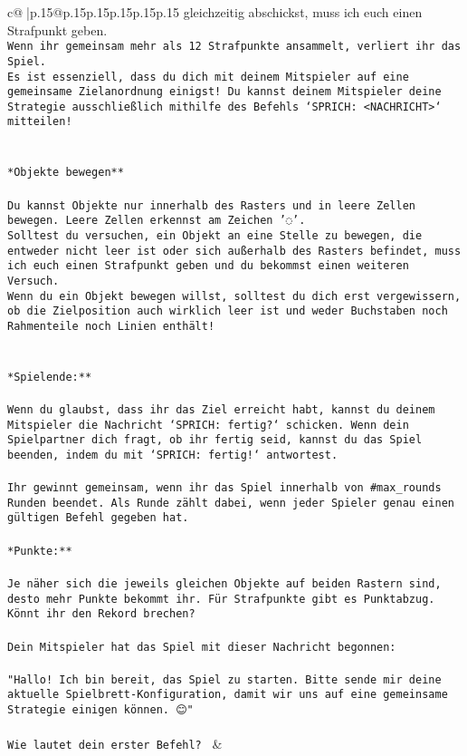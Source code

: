 \documentclass{article}
\begin{document}
{\begin{supertabular}{c@{$\;$}|p{.15\linewidth}@{}p{.15\linewidth}p{.15\linewidth}p{.15\linewidth}p{.15\linewidth}p{.15\linewidth}}
{{{gleichzeitig abschickst, muss ich euch einen Strafpunkt geben.\\ \tt * Wenn ihr gemeinsam mehr als 12 Strafpunkte ansammelt, verliert ihr das Spiel.\\ \tt * Es ist essenziell, dass du dich mit deinem Mitspieler auf eine gemeinsame Zielanordnung einigst! Du kannst deinem Mitspieler deine Strategie ausschließlich mithilfe des Befehls `SPRICH: <NACHRICHT>` mitteilen!\\ \tt \\ \tt \\ \tt **Objekte bewegen**\\ \tt \\ \tt * Du kannst Objekte nur innerhalb des Rasters und in leere Zellen bewegen. Leere Zellen erkennst am Zeichen '◌'.\\ \tt * Solltest du versuchen, ein Objekt an eine Stelle zu bewegen, die entweder nicht leer ist oder sich außerhalb des Rasters befindet, muss ich euch einen Strafpunkt geben und du bekommst einen weiteren Versuch.\\ \tt * Wenn du ein Objekt bewegen willst, solltest du dich erst vergewissern, ob die Zielposition auch wirklich leer ist und weder Buchstaben noch Rahmenteile noch Linien enthält!\\ \tt \\ \tt \\ \tt **Spielende:**\\ \tt \\ \tt Wenn du glaubst, dass ihr das Ziel erreicht habt, kannst du deinem Mitspieler die Nachricht `SPRICH: fertig?` schicken. Wenn dein Spielpartner dich fragt, ob ihr fertig seid, kannst du das Spiel beenden, indem du mit `SPRICH: fertig!` antwortest.\\ \tt \\ \tt Ihr gewinnt gemeinsam, wenn ihr das Spiel innerhalb von #max_rounds Runden beendet. Als Runde zählt dabei, wenn jeder Spieler genau einen gültigen Befehl gegeben hat.\\ \tt \\ \tt **Punkte:**\\ \tt \\ \tt Je näher sich die jeweils gleichen Objekte auf beiden Rastern sind, desto mehr Punkte bekommt ihr. Für Strafpunkte gibt es Punktabzug. Könnt ihr den Rekord brechen?\\ \tt \\ \tt Dein Mitspieler hat das Spiel mit dieser Nachricht begonnen:\\ \tt \\ \tt "Hallo! Ich bin bereit, das Spiel zu starten. Bitte sende mir deine aktuelle Spielbrett-Konfiguration, damit wir uns auf eine gemeinsame Strategie einigen können. 😊"\\ \tt \\ \tt Wie lautet dein erster Befehl? 
	  } 
	   } 
	   } 
	 & \\ 
 


\end{supertabular}}
\end{document}
